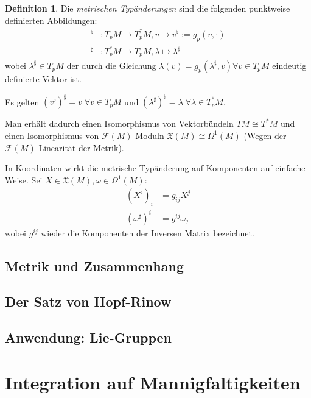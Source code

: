 \documentclass[a4paper]{scrreprt}
\numberwithin{equation}{chapter}
\newcommand{\sm}{\mathcal{F}}
\newcommand{\vf}{\mathfrak{X}}
\theoremstyle{definition}
\newtheorem{defn}{Definition}[section]
\begin{document}
		\begin{defn}
			Die \emph{metrischen Typänderungen} sind die folgenden punktweise definierten Abbildungen:
			\begin{align*}
				^{\flat}&\colon T_pM\rightarrow T_p^*M, v\mapsto v^{\flat}:=g_p(v,\cdot)\\
				^{\sharp}&\colon T_p^*M\rightarrow T_pM, \lambda\mapsto \lambda^{\sharp}
			\end{align*}
			wobei $\lambda^{\sharp}\in T_pM$ der durch die Gleichung $\lambda(v)=g_p(\lambda^{\sharp},v)\forall v\in T_pM$ eindeutig definierte Vektor ist.
			
			Es gelten $(v^{\flat})^{\sharp}=v\;\forall v\in T_pM$ und $(\lambda^{\sharp})^{\flat}=\lambda\;\forall\lambda\in T_p^*M$.
			
			Man erhält dadurch einen Isomorphismus von Vektorbündeln $TM\cong T^*M$ und einen Isomorphismus von $\sm(M)$-Moduln $\vf(M)\cong \Omega^1(M)$ (Wegen der $\sm(M)$-Linearität der Metrik).
			
			In Koordinaten wirkt die metrische Typänderung auf Komponenten auf einfache Weise. Sei $X\in\vf(M), \omega\in\Omega^1(M)$:
			\begin{align*}
				(X^{\flat})_i&=g_{ij}X^j\\
				(\omega^{\sharp})^i&=g^{ij}\omega_j
			\end{align*}
			wobei $g^{ij}$ wieder die Komponenten der Inversen Matrix bezeichnet.
		\end{defn}
	\section{Metrik und Zusammenhang}
	\section{Der Satz von Hopf-Rinow}
	\section{Anwendung: Lie-Gruppen}


\chapter{Integration auf Mannigfaltigkeiten}
\end{document}

